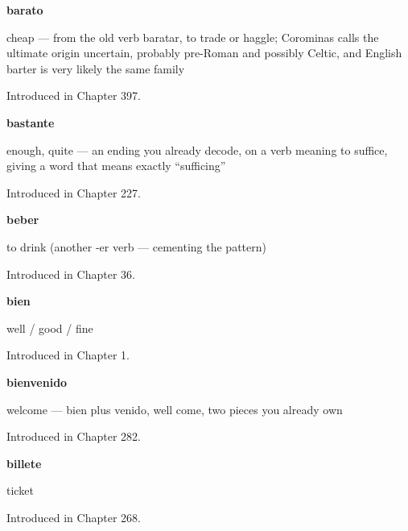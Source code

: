 \noindent\begin{minipage}[t]{\linewidth}
\raggedright
\textbf{barato}\par
\small cheap — from the old verb baratar, to trade or haggle; Corominas calls the ultimate origin uncertain, probably pre-Roman and possibly Celtic, and English barter is very likely the same family\par
\footnotesize Introduced in Chapter 397.
\end{minipage}\par\medskip

\noindent\begin{minipage}[t]{\linewidth}
\raggedright
\textbf{bastante}\par
\small enough, quite — an ending you already decode, on a verb meaning to suffice, giving a word that means exactly \textquotedblleft{}sufficing\textquotedblright{}\par
\footnotesize Introduced in Chapter 227.
\end{minipage}\par\medskip

\noindent\begin{minipage}[t]{\linewidth}
\raggedright
\textbf{beber}\par
\small to drink (another -er verb — cementing the pattern)\par
\footnotesize Introduced in Chapter 36.
\end{minipage}\par\medskip

\noindent\begin{minipage}[t]{\linewidth}
\raggedright
\textbf{bien}\par
\small well / good / fine\par
\footnotesize Introduced in Chapter 1.
\end{minipage}\par\medskip

\noindent\begin{minipage}[t]{\linewidth}
\raggedright
\textbf{bienvenido}\par
\small welcome — bien plus venido, well come, two pieces you already own\par
\footnotesize Introduced in Chapter 282.
\end{minipage}\par\medskip

\noindent\begin{minipage}[t]{\linewidth}
\raggedright
\textbf{billete}\par
\small ticket\par
\footnotesize Introduced in Chapter 268.
\end{minipage}\par\medskip

